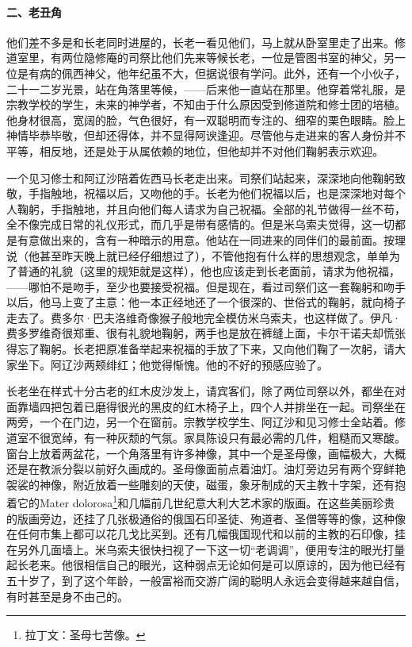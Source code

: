 \paragraph*{二、老丑角}
\par 他们差不多是和长老同时进屋的，长老一看见他们，马上就从卧室里走了出来。修道室里，有两位隐修庵的司祭比他们先来等候长老，一位是管图书室的神父，另一位是有病的佩西神父，他年纪虽不大，但据说很有学问。此外，还有一个小伙子，二十一二岁光景，站在角落里等候，——后来他一直站在那里。他穿着常礼服，是宗教学校的学生，未来的神学者，不知由于什么原因受到修道院和修士团的培植。他身材很高，宽阔的脸，气色很好，有一双聪明而专注的、细窄的栗色眼睛。脸上神情毕恭毕敬，但却还得体，并不显得阿谀逢迎。尽管他与走进来的客人身份并不平等，相反地，还是处于从属依赖的地位，但他却并不对他们鞠躬表示欢迎。
\par 一个见习修士和阿辽沙陪着佐西马长老走出来。司祭们站起来，深深地向他鞠躬致敬，手指触地，祝福以后，又吻他的手。长老为他们祝福以后，也是深深地对每个人鞠躬，手指触地，并且向他们每人请求为自己祝福。全部的礼节做得一丝不苟，全不像完成日常的礼仪形式，而几乎是带有感情的。但是米乌索夫觉得，这一切都是有意做出来的，含有一种暗示的用意。他站在一同进来的同伴们的最前面。按理说（他甚至昨天晚上就已经仔细想过了），不管他抱有什么样的思想观念，单单为了普通的礼貌（这里的规矩就是这样），他也应该走到长老面前，请求为他祝福，——哪怕不是吻手，至少也要接受祝福。但是现在，看过司祭们这一套鞠躬和吻手以后，他马上变了主意：他一本正经地还了一个很深的、世俗式的鞠躬，就向椅子走去了。费多尔·巴夫洛维奇像猴子般地完全模仿米乌索夫，也这样做了。伊凡·费多罗维奇很郑重、很有礼貌地鞠躬，两手也是放在裤缝上面，卡尔干诺夫却慌张得忘了鞠躬。长老把原准备举起来祝福的手放了下来，又向他们鞠了一次躬，请大家坐下。阿辽沙两颊绯红；他觉得惭愧。他的不好的预感应验了。
\par 长老坐在样式十分古老的红木皮沙发上，请宾客们，除了两位司祭以外，都坐在对面靠墙四把包着已磨得很光的黑皮的红木椅子上，四个人并排坐在一起。司祭坐在两旁，一个在门边，另一个在窗前。宗教学校学生、阿辽沙和见习修士全站着。修道室不很宽绰，有一种灰颓的气氛。家具陈设只有最必需的几件，粗糙而又寒酸。窗台上放着两盆花，一个角落里有许多神像，其中一个是圣母像，画幅极大，大概还是在教派分裂以前好久画成的。圣母像面前点着油灯。油灯旁边另有两个穿鲜艳袈裟的神像，附近放着一些雕刻的天使，磁蛋，象牙制成的天主教十字架，还有抱着它的Mater dolorosa\footnote{拉丁文：圣母七苦像。}和几幅前几世纪意大利大艺术家的版画。在这些美丽珍贵的版画旁边，还挂了几张极通俗的俄国石印圣徒、殉道者、圣僧等等的像，这种像在任何市集上都可以花几戈比买到。还有几幅俄国现代和以前的主教的石印像，挂在另外几面墙上。米乌索夫很快扫视了一下这一切“老调调”，便用专注的眼光打量起长老来。他很相信自己的眼光，这种弱点无论如何是可以原谅的，因为他已经有五十岁了，到了这个年龄，一般富裕而交游广阔的聪明人永远会变得越来越自信，有时甚至是身不由己的。
